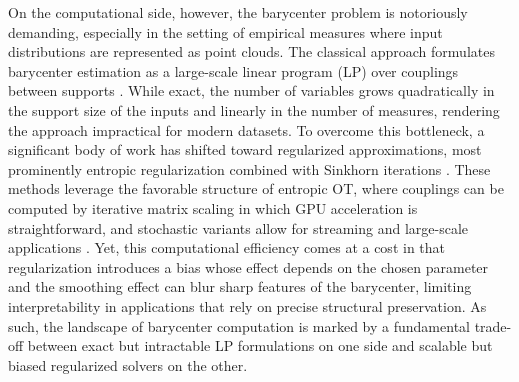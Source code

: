 \documentclass[11pt]{article}
\begin{document}
On the computational side, however, the barycenter problem is notoriously demanding, especially in the setting of empirical measures where input distributions are represented as point clouds. The classical approach formulates barycenter estimation as a large-scale linear program (LP) over couplings between supports \citep{bazaraa_2010_LinearProgrammingNetwork}. While exact, the number of variables grows quadratically in the support size of the inputs and linearly in the number of measures, rendering the approach impractical for modern datasets. To overcome this bottleneck, a significant body of work has shifted toward regularized approximations, most prominently entropic regularization combined with Sinkhorn iterations \citep{cuturi_2013_SinkhornDistancesLightspeed, benamou_2015_IterativeBregmanProjections}. These methods leverage the favorable structure of entropic OT, where couplings can be computed by iterative matrix scaling in which GPU acceleration is straightforward, and stochastic variants allow for streaming and large-scale applications \citep{genevay_2016_StochasticOptimizationLargescale}. Yet, this computational efficiency comes at a cost in that regularization introduces a bias whose effect depends on the chosen parameter and the smoothing effect can blur sharp features of the barycenter, limiting interpretability in applications that rely on precise structural preservation. As such, the landscape of barycenter computation is marked by a fundamental trade-off between exact but intractable LP formulations on one side and scalable but biased regularized solvers on the other. 
\end{document}
